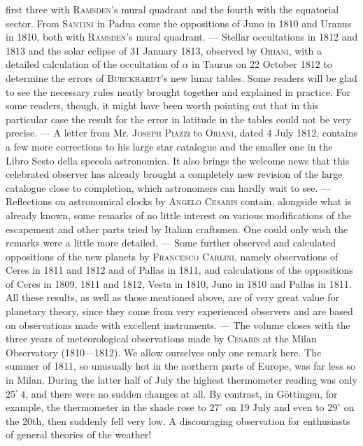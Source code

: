 first three with \textsc{Ramsden}'s mural quadrant and the fourth with the equatorial sector. From \textsc{Santini} in Padua come the oppositions of Juno in 1810 and Uranus in 1810, both with \textsc{Ramsden}'s mural quadrant. --- Stellar occultations in 1812 and 1813 and the solar eclipse of 31 January 1813, observed by \textsc{Oriani}, with a detailed calculation of the occultation of $\alpha$ in Taurus on 22 October 1812 to determine the errors of \textsc{Burckhardt}'s new lunar tables. Some readers will be glad to see the necessary rules neatly brought together and explained in practice. For some readers, though, it might have been worth pointing out that in this particular case the result for the error in latitude in the tables could not be very precise. --- A letter from Mr. \textsc{Joseph Piazzi} to \textsc{Oriani}, dated 4 July 1812, contains a few more corrections to his large star catalogue and the smaller one in the Libro Sesto della specola astronomica. It also brings the welcome news that this celebrated observer has already brought a completely new revision of the large catalogue close to completion, which astronomers can hardly wait to see. --- Reflections on astronomical clocks by \textsc{Angelo Cesaris} contain, alongside what is already known, some remarks of no little interest on various modifications of the escapement and other parts tried by Italian craftsmen. One could only wish the remarks were a little more detailed. --- Some further observed and calculated oppositions of the new planets by \textsc{Francesco Carlini}, namely observations of Ceres in 1811 and 1812 and of Pallas in 1811, and calculations of the oppositions of Ceres in 1809, 1811 and 1812, Vesta in 1810, Juno in 1810 and Pallas in 1811. All these results, as well as those mentioned above, are of very great value for planetary theory, since they come from very experienced observers and are based on observations made with excellent instruments. --- The volume closes with the three years of meteorological observations made by \textsc{Cesaris} at the Milan Observatory (1810---1812). We allow ourselves only one remark here. The summer of 1811, so unusually hot in the northern parts of Europe, was far less so in Milan. During the latter half of July the highest thermometer reading was only $25^\circ\,4$, and there were no sudden changes at all. By contrast, in Göttingen, for example, the thermometer in the shade rose to $27^\circ$ on 19 July and even to $29^\circ$ on the 20th, then suddenly fell very low. A discouraging observation for enthusiasts of general theories of the weather!
